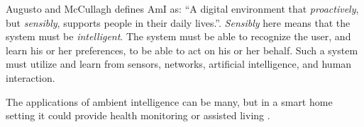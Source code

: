 Augusto and McCullagh \cite{augusto2007ambient} defines AmI as: ``A digital environment that \emph{proactively}, but \emph{sensibly}, supports people in their daily lives.''.
\emph{Sensibly} here means that the system must be \emph{intelligent}. 
The system must be able to recognize the user, 
and learn his or her preferences,
to be able to act on his or her behalf. 
Such a system must utilize and learn from sensors, networks, artificial intelligence, and human interaction. 

The applications of ambient intelligence can be many, 
but in a smart home setting it could provide health monitoring or assisted living \cite{acampora2013survey}.

